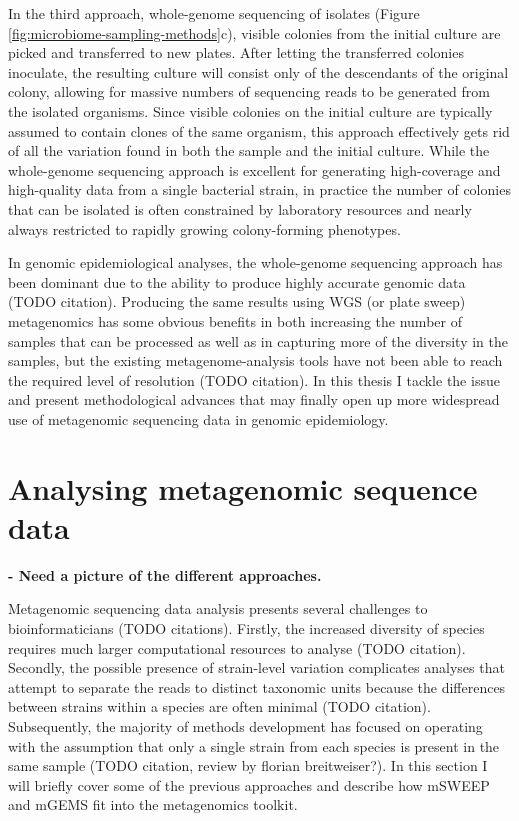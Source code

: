 \documentclass[officiallayout]{tktla}
\begin{document}
In the third approach, whole-genome sequencing of isolates (Figure
\ref{fig:microbiome-sampling-methods}c), visible colonies from the
initial culture are picked and transferred to new plates. After
letting the transferred colonies inoculate, the resulting culture will
consist only of the descendants of the original colony, allowing for
massive numbers of sequencing reads to be generated from the isolated
organisms. Since visible colonies on the initial culture are typically
assumed to contain clones of the same organism, this approach
effectively gets rid of all the variation found in both the sample and
the initial culture. While the whole-genome sequencing approach is
excellent for generating high-coverage and high-quality data from a
single bacterial strain, in practice the number of colonies that can
be isolated is often constrained by laboratory resources and nearly
always restricted to rapidly growing colony-forming phenotypes.

In genomic epidemiological analyses, the whole-genome sequencing
approach has been dominant due to the ability to produce highly
accurate genomic data (TODO citation). Producing the same results
using WGS (or plate sweep) metagenomics has some obvious benefits in
both increasing the number of samples that can be processed as well as
in capturing more of the diversity in the samples, but the existing
metagenome-analysis tools have not been able to reach the required
level of resolution (TODO citation). In this thesis I tackle the issue
and present methodological advances that may finally open up more
widespread use of metagenomic sequencing data in genomic epidemiology.

\section{Analysing metagenomic sequence data}

\textbf{- Need a picture of the different approaches.}

Metagenomic sequencing data analysis presents several challenges to
bioinformaticians (TODO citations). Firstly, the increased diversity
of species requires much larger computational resources to analyse
(TODO citation). Secondly, the possible presence of strain-level
variation complicates analyses that attempt to separate the reads to
distinct taxonomic units because the differences between strains
within a species are often minimal (TODO citation). Subsequently, the
majority of methods development has focused on operating with the
assumption that only a single strain from each species is present in
the same sample (TODO citation, review by florian breitweiser?). In
this section I will briefly cover some of the previous approaches and
describe how mSWEEP and mGEMS fit into the metagenomics toolkit.
\end{document}
